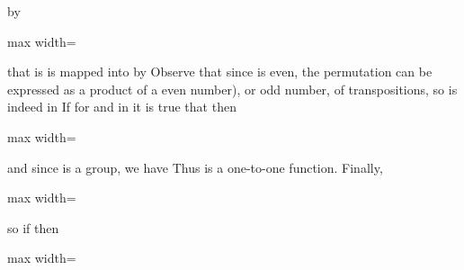 \documentclass[11pt,oneside]{article}
\begin{document}
\begin{BookBody}
\noindent by

\begin{center}\begin{adjustbox}{max width=\linewidth}\BookInline{\displaystyle \lambda _{\tau }(\sigma )= \tau \sigma ,\allowbreak }\end{adjustbox}\end{center}

\noindent that is is mapped into  by  Observe that since \BookInline{\sigma } is even, the permutation  can be expressed as a product of a  even number), or odd number, of transpositions, so  is indeed in  If for \BookInline{\sigma } and \BookInline{\mu } in  it is true that \BookInline{\lambda _{\tau }(\sigma )= \lambda _{\tau }(\mu ),\allowbreak } then

\begin{center}\begin{adjustbox}{max width=\linewidth}\end{adjustbox}\end{center}

\noindent and since  is a group, we have  Thus \BookInline{\lambda _{\tau }} is a one-to-one function. Finally,

\begin{center}\begin{adjustbox}{max width=\linewidth}\end{adjustbox}\end{center}

\noindent so if  then

\begin{center}\begin{adjustbox}{max width=\linewidth}\end{adjustbox}\end{center}

\end{BookBody}

\BookNarrativetrue
\end{document}

